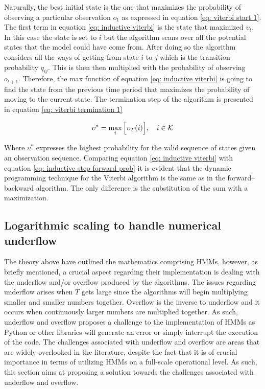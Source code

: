 Naturally, the best initial state is the one that maximizes the probability of observing a particular observation $o_1$ as expressed in equation \ref{eq: viterbi start 1}. The first term in equation \ref{eq: inductive viterbi} is the state that maximized $\upsilon_t$. In this case the state is set to $i$ but the algorithm scans over all the potential states that the model could have come from. After doing so the algorithm considers all the ways of getting from state  $i$ to $j$ which is the transition probability $q_{ij}$. This is then then multiplied with the probability of observing $o_{t+1}$. Therefore, the max function of equation \ref{eq: inductive viterbi} is going to find the state from the previous time period that maximizes the probability of moving to the current state. The termination step of the algorithm is presented in equation \ref{eq: viterbi termination 1} 

\begin{equation}
    \upsilon^* = \max_{i}\Big[\upsilon_T(i)\Big],
    \quad i \in\operatorname{\mathcal{K}}
    \label{eq: viterbi termination 1}
\end{equation}

Where $\upsilon^*$ expresses the highest probability for the valid sequence of states given an observation sequence. Comparing equation \ref{eq: inductive viterbi} with equation \ref{eq: inductive step forward prob} it is evident that the dynamic programming technique for the Viterbi algorithm is the same as in the forward–backward
algorithm. The only difference is the substitution of the sum with a maximization.

\subsection{Logarithmic scaling to handle numerical underflow}
\label{subsection: log scalling underflow}

The theory above have outlined the mathematics comprising HMMs, however, as briefly mentioned, a crucial aspect regarding their implementation is dealing with the underflow and/or overflow produced by the algorithms. The issues regarding underflow arises when $T$ gets large since the algorithms will begin multiplying smaller and smaller numbers together. Overflow is the inverse to underflow and it occurs when continuously larger numbers are multiplied together. As such, underflow and overflow proposes a challenge to the implementation of HMMs as Python or other libraries will generate an error or simply interrupt the execution of the code. The challenges associated with underflow and overflow are areas that are widely overlooked in the literature, despite the fact that it is of crucial importance in terms of utilizing HMMs on a full-scale operational level. As such, this section aims at proposing a solution towards the challenges associated with underflow and overflow.

